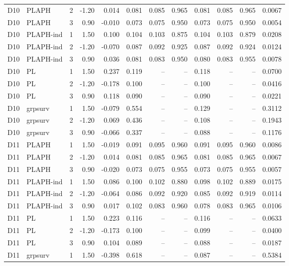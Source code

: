 \begin{longtable}{cllrrrrrrrrr}
D10 & PLAPH & 2 & -1.20 & 0.014 & 0.081 & 0.085 & 0.965 & 0.081 & 0.085 & 0.965 & 0.0067 \\
D10 & PLAPH & 3 & 0.90 & -0.010 & 0.073 & 0.075 & 0.950 & 0.073 & 0.075 & 0.950 & 0.0054 \\
D10 & PLAPH-ind & 1 & 1.50 & 0.100 & 0.104 & 0.103 & 0.875 & 0.104 & 0.103 & 0.879 & 0.0208 \\
D10 & PLAPH-ind & 2 & -1.20 & -0.070 & 0.087 & 0.092 & 0.925 & 0.087 & 0.092 & 0.924 & 0.0124 \\
D10 & PLAPH-ind & 3 & 0.90 & 0.036 & 0.081 & 0.083 & 0.950 & 0.080 & 0.083 & 0.955 & 0.0078 \\
D10 & PL & 1 & 1.50 & 0.237 & 0.119 & -- & -- & 0.118 & -- & -- & 0.0700 \\
D10 & PL & 2 & -1.20 & -0.178 & 0.100 & -- & -- & 0.100 & -- & -- & 0.0416 \\
D10 & PL & 3 & 0.90 & 0.118 & 0.090 & -- & -- & 0.090 & -- & -- & 0.0221 \\
D10 & grpsurv & 1 & 1.50 & -0.079 & 0.554 & -- & -- & 0.129 & -- & -- & 0.3112 \\
D10 & grpsurv & 2 & -1.20 & 0.069 & 0.436 & -- & -- & 0.108 & -- & -- & 0.1943 \\
D10 & grpsurv & 3 & 0.90 & -0.066 & 0.337 & -- & -- & 0.088 & -- & -- & 0.1176 \\
D11 & PLAPH & 1 & 1.50 & -0.019 & 0.091 & 0.095 & 0.960 & 0.091 & 0.095 & 0.960 & 0.0086 \\
D11 & PLAPH & 2 & -1.20 & 0.014 & 0.081 & 0.085 & 0.965 & 0.081 & 0.085 & 0.965 & 0.0067 \\
D11 & PLAPH & 3 & 0.90 & -0.020 & 0.073 & 0.075 & 0.955 & 0.073 & 0.075 & 0.955 & 0.0057 \\
D11 & PLAPH-ind & 1 & 1.50 & 0.086 & 0.100 & 0.102 & 0.880 & 0.098 & 0.102 & 0.889 & 0.0175 \\
D11 & PLAPH-ind & 2 & -1.20 & -0.064 & 0.086 & 0.092 & 0.920 & 0.085 & 0.092 & 0.919 & 0.0114 \\
D11 & PLAPH-ind & 3 & 0.90 & 0.017 & 0.102 & 0.083 & 0.960 & 0.078 & 0.083 & 0.965 & 0.0106 \\
D11 & PL & 1 & 1.50 & 0.223 & 0.116 & -- & -- & 0.116 & -- & -- & 0.0633 \\
D11 & PL & 2 & -1.20 & -0.173 & 0.100 & -- & -- & 0.099 & -- & -- & 0.0400 \\
D11 & PL & 3 & 0.90 & 0.104 & 0.089 & -- & -- & 0.088 & -- & -- & 0.0187 \\
D11 & grpsurv & 1 & 1.50 & -0.398 & 0.618 & -- & -- & 0.087 & -- & -- & 0.5384 \\

\end{longtable}
